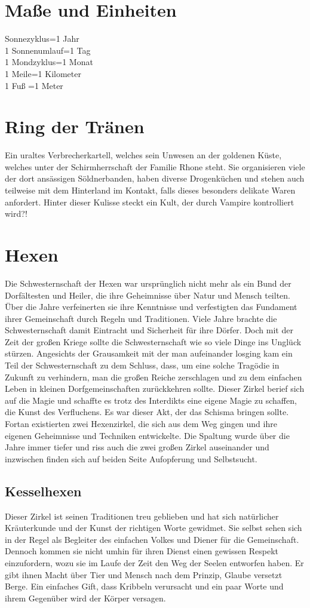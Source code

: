 \documentclass[a4paper,12pt,oneside]{book}
\begin{document}
\chapter{Maße und Einheiten}
Sonnezyklus=1 Jahr
\\1 Sonnenumlauf=1 Tag
\\1 Mondzyklus=1 Monat
\\1 Meile=1 Kilometer
\\1 Fuß =1 Meter

\chapter{Ring der Tränen}
Ein uraltes Verbrecherkartell, welches sein Unwesen an der goldenen Küste, welches unter der Schirmherrschaft der Familie Rhone steht. Sie organisieren viele der dort ansässigen Söldnerbanden, haben diverse Drogenküchen und stehen auch teilweise mit dem Hinterland im Kontakt, falls dieses besonders delikate Waren anfordert. Hinter dieser Kulisse steckt ein Kult, der durch Vampire kontrolliert wird?!

\chapter{Hexen}
Die Schwesternschaft der Hexen war ursprünglich nicht mehr als ein Bund der Dorfältesten und Heiler, die ihre Geheimnisse über Natur und Mensch teilten. Über die Jahre verfeinerten sie ihre Kenntnisse und verfestigten das Fundament ihrer Gemeinschaft durch Regeln und Traditionen. Viele Jahre brachte die Schwesternschaft damit Eintracht und Sicherheit für ihre Dörfer. Doch mit der Zeit der großen Kriege sollte die Schwesternschaft wie so viele Dinge ins Unglück stürzen. Angesichts der Grausamkeit mit der man aufeinander losging kam ein Teil der Schwesternschaft zu dem Schluss, dass, um eine solche Tragödie in Zukunft zu verhindern, man die großen Reiche zerschlagen und zu dem einfachen Leben in kleinen Dorfgemeinschaften zurückkehren sollte. Dieser Zirkel berief sich auf die Magie und schaffte es trotz des Interdikts eine eigene Magie zu schaffen, die Kunst des Verfluchens. Es war dieser Akt, der das Schisma bringen sollte. Fortan existierten zwei Hexenzirkel, die sich aus dem Weg gingen und ihre eigenen Geheimnisse und Techniken entwickelte. Die Spaltung wurde über die Jahre immer tiefer und riss auch die zwei großen Zirkel auseinander und inzwischen finden sich auf beiden Seite Aufopferung und Selbstsucht.   
\section{Kesselhexen}
Dieser Zirkel ist seinen Traditionen treu geblieben und hat sich natürlicher Kräuterkunde und der Kunst der richtigen Worte gewidmet. Sie selbst sehen sich in der Regel als Begleiter des einfachen Volkes und Diener für die Gemeinschaft. Dennoch kommen sie nicht umhin für ihren Dienst einen gewissen Respekt einzufordern, wozu sie im Laufe der Zeit den Weg der Seelen entworfen haben. Er gibt ihnen Macht über Tier und Mensch nach dem Prinzip, Glaube versetzt Berge. Ein einfaches Gift, dass Kribbeln verursacht und ein paar Worte und ihrem Gegenüber wird der Körper versagen.
\end{document}
